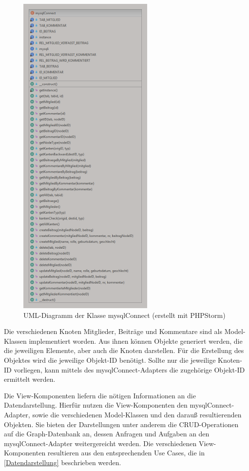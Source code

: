\begin{figure}
	\caption{UML-Diagramm der Klasse \grqq mysqlConnect\grqq{} (erstellt mit PHPStorm)}
	\centering
	\includegraphics[width=0.6\textwidth]{images/mysqlConnect2.png}
\end{figure}

Die verschiedenen Knoten Mitglieder, Beiträge und Kommentare sind als Model-Klassen implementiert worden. Aus ihnen können Objekte generiert werden, die die jeweiligen Elemente, aber auch die Knoten darstellen. Für die Erstellung des Objektes wird die jeweilige Objekt-ID benötigt. Sollte nur die jeweilige Knoten-ID vorliegen, kann mittels des mysqlConnect-Adapters die zugehörige Objekt-ID ermittelt werden.

Die View-Komponenten liefern die nötigen Informationen an die Datendarstellung. Hierfür nutzen die View-Komponenten den mysqlConnect-Adapter, sowie die verschiedenen Model-Klassen und den darauß resultierenden Objekten. Sie bieten der Darstellungen unter anderem die CRUD-Operationen auf die Graph-Datenbank an, dessen Anfragen und Aufgaben an den mysqlConnect-Adapter weitergereicht werden. Die verschiedenen View-Komponenten resultieren aus den entsprechenden Use Cases, die in \ref{Datendarstellung}  beschrieben werden.

